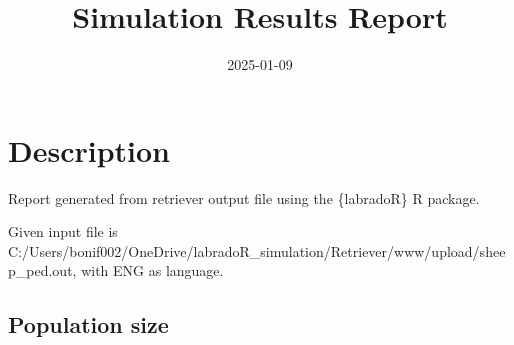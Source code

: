 \documentclass[
]{article}
\title{Simulation Results Report}
\author{}
\date{\vspace{-2.5em}2025-01-09}
\newenvironment{Shaded}{\begin{snugshade}}{\end{snugshade}}
\newcommand{\AttributeTok}[1]{\textcolor[rgb]{0.13,0.29,0.53}{#1}}
\newcommand{\FunctionTok}[1]{\textcolor[rgb]{0.13,0.29,0.53}{\textbf{#1}}}
\newcommand{\NormalTok}[1]{#1}
\newcommand{\OtherTok}[1]{\textcolor[rgb]{0.56,0.35,0.01}{#1}}
\newcommand{\SpecialCharTok}[1]{\textcolor[rgb]{0.81,0.36,0.00}{\textbf{#1}}}
\begin{document}
\maketitle

\begin{Shaded}
\end{Shaded}

\section{Description}\label{description}

Report generated from retriever output file using the \{labradoR\} R
package.

Given input file is
C:/Users/bonif002/OneDrive/labradoR\_simulation/Retriever/www/upload/sheep\_ped.out,
with ENG as language.

\subsection{Population size}\label{population-size}

\begin{Shaded}
\end{Shaded}
\end{document}
